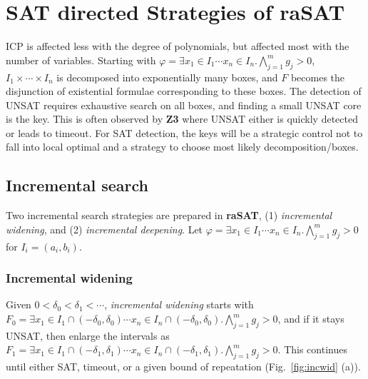 \documentclass[runningheads,a4paper,oribibl]{llncs}
\begin{document}
\section{SAT directed Strategies of {\bf raSAT}} \label{sec:strategy}

ICP is affected less with the degree of polynomials, but affected most with the number of variables. 
Starting with $\varphi = \exists x_1 \in I_1 \cdots x_n \in I_n. \bigwedge \limits_{j=1}^m g_j > 0$, 
$I_1 \times \cdots \times I_n$ is decomposed into exponentially many boxes, 
and $F$ becomes the disjunction of existential formulae corresponding to these boxes.
The detection of UNSAT requires exhaustive search on all boxes, and finding a small UNSAT core
is the key. This is often observed by {\bf Z3} where UNSAT either is quickly detected or leads to timeout. 
For SAT detection, the keys will be a strategic control not to fall into local optimal and
a strategy to choose most likely decomposition/boxes. 

\subsection{Incremental search} \label{sec:incsearch}

Two incremental search strategies are prepared in {\bf raSAT}, 
(1) {\em incremental widening}, and (2) {\em incremental deepening}. 
Let
$\varphi = \exists x_1 \in I_1 \cdots x_n \in I_n. \bigwedge \limits_{j=1}^m g_j > 0$
for $I_i = (a_i,b_i)$. %

\subsubsection*{Incremental widening}
Given $0 < \delta_0 < \delta_1 < \cdots$, 
{\em incremental widening} starts with 
$F_0 = \exists x_1 \in I_1 \cap (-\delta_0 , \delta_0) \cdots x_n \in I_n \cap (-\delta_0 , \delta_0). 
\bigwedge \limits_{j=1}^m g_j > 0$, 
and if it stays  UNSAT, then enlarge the intervals as 
$F_1 = \exists x_1 \in I_1 \cap (-\delta_1 , \delta_1) \cdots x_n \in I_n \cap (-\delta_1 , \delta_1). 
\bigwedge \limits_{j=1}^m g_j > 0$. This continues until either SAT, timeout, or
a given bound of repeatation (Fig.~\ref{fig:incwid} (a)). 
\end{document}

